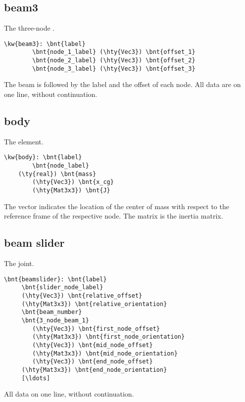 \subsection{beam3}
The three-node .
\begin{Verbatim}[commandchars=\\\{\}]
    \kw{beam3}: \bnt{label}
        \bnt{node_1_label} (\hty{Vec3}) \bnt{offset_1}
        \bnt{node_2_label} (\hty{Vec3}) \bnt{offset_2}
        \bnt{node_3_label} (\hty{Vec3}) \bnt{offset_3}
\end{Verbatim}
The beam  is followed by the label and the offset of each node.
All data are on one line, without continuation.

\subsection{body}
The  element.
\begin{Verbatim}[commandchars=\\\{\}]
    \kw{body}: \bnt{label}
        \bnt{node_label} 
	(\ty{real}) \bnt{mass}
        (\hty{Vec3}) \bnt{x_cg}
        (\hty{Mat3x3}) \bnt{J}
\end{Verbatim}
The  vector indicates the location of the center of mass with respect to
the reference frame of the respective node. The  matrix is the inertia
matrix.

\subsection{beam slider}
The  joint.
\begin{Verbatim}[commandchars=\\\{\}]
    \bnt{beamslider}: \bnt{label}
   	 \bnt{slider_node_label}
	 (\hty{Vec3}) \bnt{relative_offset}
	 (\hty{Mat3x3}) \bnt{relative_orientation}
	 \bnt{beam_number}
	 \bnt{3_node_beam_1}
	 	(\hty{Vec3}) \bnt{first_node_offset}
	 	(\hty{Mat3x3}) \bnt{first_node_orientation}
	 	(\hty{Vec3}) \bnt{mid_node_offset}
	 	(\hty{Mat3x3}) \bnt{mid_node_orientation}
	 	(\hty{Vec3}) \bnt{end_node_offset}
	 (\hty{Mat3x3}) \bnt{end_node_orientation}
	 [\ldots]
\end{Verbatim}
All data on one line, without continuation.
